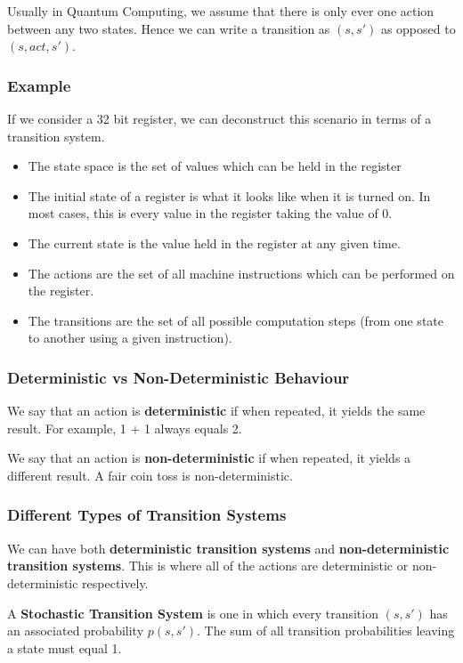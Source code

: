 \documentclass[12pt]{article}
\begin{document}
Usually in Quantum Computing, we assume that there is only ever one action between any two states. Hence we can write a transition as $(s, s')$ as opposed to $(s, act, s')$.

\subsubsection{Example}

If we consider a 32 bit register, we can deconstruct this scenario in terms of a transition system.

\begin{itemize}
	\item The state space is the set of values which can be held in the register
	\item The initial state of a register is what it looks like when it is turned on. In most cases, this is every value in the register taking the value of 0.
	\item The current state is the value held in the register at any given time.
	\item The actions are the set of all machine instructions which can be performed on the register.
	\item The transitions are the set of all possible computation steps (from one state to another using a given instruction).
\end{itemize}

\subsubsection{Deterministic vs Non-Deterministic Behaviour}

We say that an action is \textbf{deterministic} if when repeated, it yields the same result. For example, 1 + 1 always equals 2.

We say that an action is \textbf{non-deterministic} if when repeated, it yields a different result. A fair coin toss is non-deterministic.

\subsubsection{Different Types of Transition Systems}

We can have both \textbf{deterministic transition systems} and \textbf{non-deterministic transition systems}. This is where all of the actions are deterministic or non-deterministic respectively.

A \textbf{Stochastic Transition System} is one in which every transition $(s, s')$ has an associated probability $p(s, s')$. The sum of all transition probabilities leaving a state must equal 1. 
\end{document}
